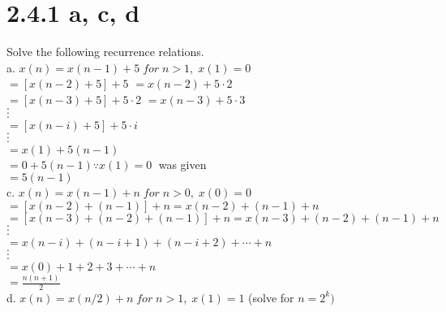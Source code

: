 \documentclass[8pt, letterpaper]{article}
\begin{document}
\section{2.4.1 a, c, d}
Solve the following recurrence relations. \\
\indent a. $x(n) = x(n-1) + 5 \; for \; n > 1, \; x(1) = 0$ \\
\indent \indent $= [x(n-2) + 5] + 5$ 
                $= x(n-2) + 5\cdot2$ \\
\indent \indent $= [x(n-3)+5] + 5\cdot2$ 
                $= x(n-3) + 5\cdot3$\\
\indent \indent \indent \indent $\cdot$ \\
\indent \indent \indent \indent $\cdot$ \\
\indent \indent \indent \indent $\cdot$ \\
\indent \indent $= [x(n-i) +5] + 5\cdot i$ \\
\indent \indent \indent \indent $\cdot$ \\
\indent \indent \indent \indent $\cdot$ \\
\indent \indent \indent \indent $\cdot$ \\
\indent \indent $= x(1) + 5(n-1)$ \\
\indent \indent $= 0 + 5(n-1) \because x(1) = 0 \;$ was given \\
\indent \indent $= 5(n-1)$ \\
\indent c. $x(n) = x(n-1) + n \; for \; n > 0, \; x(0) = 0$ \\
\indent \indent $= [x(n-2) + (n-1)] + n = x(n-2) + (n-1) + n$ \\
\indent \indent $= [x(n-3) + (n-2) + (n-1)] + n = x(n-3) + (n-2) + (n-1) + n$ \\
\indent \indent \indent \indent $\cdot$ \\
\indent \indent \indent \indent $\cdot$ \\
\indent \indent \indent \indent $\cdot$ \\
\indent \indent $= x(n-i) + (n-i+1) + (n-i+2) + \cdots + n$ \\ 
\indent \indent \indent \indent $\cdot$ \\
\indent \indent \indent \indent $\cdot$ \\
\indent \indent \indent \indent $\cdot$ \\
\indent \indent $= x(0) + 1 + 2+ 3 + \cdots + n$ \\
\indent \indent $= \frac{n(n+1)}{2}$ \\
\indent d. $x(n) = x(n/2) + n \; for \; n > 1, \; x(1) = 1$ (solve for $n = 2^k)$ \\
\end{document}
